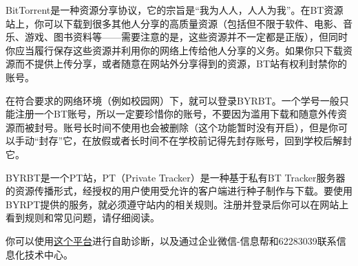
BitTorrent是一种资源分享协议，它的宗旨是“我为人人，人人为我”。在BT资源站上，你可以下载到很多其他人分享的高质量资源（包括但不限于软件、电影、音乐、游戏、图书资料等——需要注意的是，这些资源并不一定都是正版），但同时你应当履行保存这些资源并利用你的网络上传给他人分享的义务。如果你只下载资源而不提供上传分享，或者随意在网站外分享得到的资源，BT站有权利封禁你的账号。

在符合要求的网络环境（例如校园网）下，就可以登录BYRBT。一个学号一般只能注册一个BT账号，所以一定要珍惜你的账号，不要因为滥用下载和随意外传资源而被封号。账号长时间不使用也会被删除（这个功能暂时没有开启），但是你可以手动“封存”它，在放假或者长时间不在学校前记得先封存账号，回到学校后解封它。

BYRBT是一个PT站，PT（Private Tracker）是一种基于私有BT Tracker服务器的资源传播形式，经授权的用户使用受允许的客户端进行种子制作与下载。要使用BYRPT提供的服务，就必须遵守站内的相关规则。注册并登录后你可以在网站上看到规则和常见问题，请仔细阅读。


你可以使用\href{https://buptnet.icu}{这个平台}进行自助诊断，以及通过企业微信-信息帮和62283039联系信息化技术中心。
